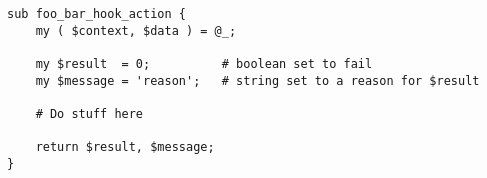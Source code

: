 \begin{verbatim}
sub foo_bar_hook_action {
    my ( $context, $data ) = @_;

    my $result  = 0;          # boolean set to fail
    my $message = 'reason';   # string set to a reason for $result

    # Do stuff here

    return $result, $message;
}
\end{verbatim}
